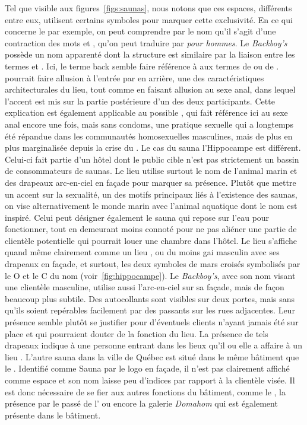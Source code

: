 Tel que visible aux figures~\ref{figs:saunas}, nous notons que ces espaces, différents entre eux, utilisent certains symboles pour marquer cette exclusivité.
En ce qui concerne le  par exemple, on peut comprendre par le nom qu'il s'agit d'une contraction des mots  et , qu'on peut traduire par \emph{pour hommes}.
Le \emph{Backboy's} possède un nom apparenté dont la structure est similaire par la liaison entre les termes  et .
Ici, le terme back semble faire référence à aux termes de  ou de .
 pourrait faire allusion à l'entrée par en arrière, une des caractéristiques architecturales du lieu, tout comme en faisant allusion au sexe anal, dans lequel l'accent est mis sur la partie postérieure d'un des deux participants.
Cette explication est également applicable au possible , qui fait référence ici au sexe anal encore une fois, mais sans condoms, une pratique sexuelle qui a longtemps été répandue dans les communautés homosexuelles masculines, mais de plus en plus marginalisée depuis la crise du \sida{}.
Le cas du sauna l'Hippocampe est différent.
Celui-ci fait partie d'un hôtel dont le public cible n'est pas strictement un bassin de consommateurs de saunas.
Le lieu utilise surtout le nom de l'animal marin et des drapeaux arc-en-ciel en façade pour marquer sa présence.
Plutôt que mettre un accent sur la sexualité, un des motifs principaux liés à l'existence des saunas, on vise alternativement le monde marin avec l'animal aquatique dont le nom est inspiré.
Celui peut désigner également le sauna qui repose sur l'eau pour fonctionner, tout en demeurant moins connoté pour ne pas aliéner une partie de clientèle potentielle qui pourrait louer une chambre dans l'hôtel.
Le lieu s'affiche quand même clairement comme un lieu \lgbt{}, ou du moins gai masculin avec ses drapeaux en façade, et surtout, les deux symboles de mars croisés symbolisés par le O et le C du nom (voir~\ref{fig:hippocampe}).
Le \emph{Backboy's}, avec son nom visant une clientèle masculine, utilise aussi l'arc-en-ciel sur sa façade, mais de façon beaucoup plus subtile.
Des autocollants sont visibles sur deux portes, mais sans qu'ils soient repérables facilement par des passants sur les rues adjacentes.
Leur présence semble plutôt se justifier pour d'éventuels clients n'ayant jamais été sur place et qui pourraient douter de la fonction du lieu.
La présence de tels drapeaux indique à une personne entrant dans les lieux qu'il ou elle a affaire à un lieu \lgbt{}.
L'autre sauna dans la ville de Québec est situé dans le même bâtiment que le .
Identifié comme Sauna par le logo en façade, il n'est pas clairement affiché comme espace \lgbt{} et son nom laisse peu d'indices par rapport à la clientèle visée.
Il est donc nécessaire de se fier aux autres fonctions du bâtiment, comme le , la présence par le passé de l'\ascgcn{} ou encore la galerie \emph{Domahom} qui est également présente dans le bâtiment.

